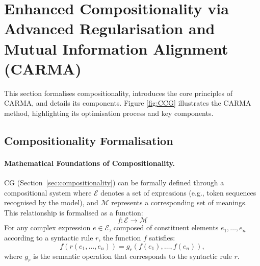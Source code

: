 \section{Enhanced Compositionality via Advanced Regularisation and Mutual Information Alignment (CARMA)}\label{sec:methodology}
This section formalises compositionality, introduces the core principles of CARMA, and details its components. Figure \ref{fig:CCG} illustrates the CARMA method, highlighting its optimisation process and key components.

\subsection{Compositionality Formalisation}
\paragraph{Mathematical Foundations of Compositionality.} CG (Section~\ref{sec:compositionality}) can be formally defined through a compositional system where $\mathcal{E}$ denotes a set of expressions (e.g., token sequences recognised by the model), and $\mathcal{M}$ represents a corresponding set of meanings. This relationship is formalised as a function:
\begin{equation}\label{eq:cg_system_1}
f: \mathcal{E} \rightarrow \mathcal{M}
\end{equation}
For any complex expression \( e \in \mathcal{E} \), composed of constituent elements \( e_1, \dots, e_n \) according to a syntactic rule \( r \), the function \( f \) satisfies:
\begin{equation}\label{eq:cg_system_2}
f(r(e_1, \dots, e_n)) = g_r(f(e_1), \dots, f(e_n)),
\end{equation}
where $g_r$ is the semantic operation that corresponds to the syntactic rule $r$.
